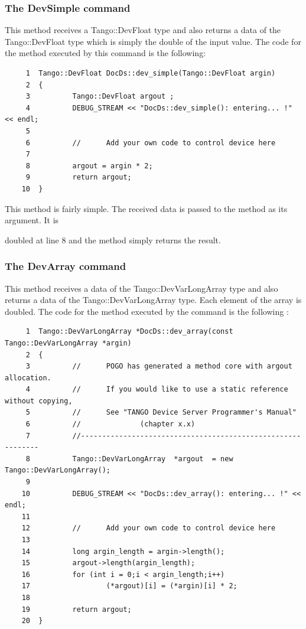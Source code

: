\subsubsection{The DevSimple command}

This method receives a Tango::DevFloat type
and also returns a data of the Tango::DevFloat type which is simply
the double of the input value. The code for the method executed by
this command is the following:


\begin{verbatim}
     1  Tango::DevFloat DocDs::dev_simple(Tango::DevFloat argin)
     2  {
     3          Tango::DevFloat argout ;
     4          DEBUG_STREAM << "DocDs::dev_simple(): entering... !" << endl;
     5  
     6          //      Add your own code to control device here
     7  
     8          argout = argin * 2;
     9          return argout;
    10  }
\end{verbatim}


This method is fairly simple. The received data is passed to the method
as its argument. It is

doubled at line 8 and the method simply returns the result.


\subsubsection{The DevArray command}

This method receives a data of the Tango::DevVarLongArray
type and also returns a data of the Tango::DevVarLongArray type. Each
element of the array is doubled. The code for the method executed
by the command is the following :


\begin{verbatim}
     1  Tango::DevVarLongArray *DocDs::dev_array(const Tango::DevVarLongArray *argin)
     2  {
     3          //      POGO has generated a method core with argout allocation.
     4          //      If you would like to use a static reference without copying,
     5          //      See "TANGO Device Server Programmer's Manual"
     6          //              (chapter x.x)
     7          //------------------------------------------------------------
     8          Tango::DevVarLongArray  *argout  = new Tango::DevVarLongArray();
     9                  
    10          DEBUG_STREAM << "DocDs::dev_array(): entering... !" << endl;
    11  
    12          //      Add your own code to control device here
    13  
    14          long argin_length = argin->length();    
    15          argout->length(argin_length);
    16          for (int i = 0;i < argin_length;i++)
    17                  (*argout)[i] = (*argin)[i] * 2;
    18  
    19          return argout;
    20  }
\end{verbatim}


